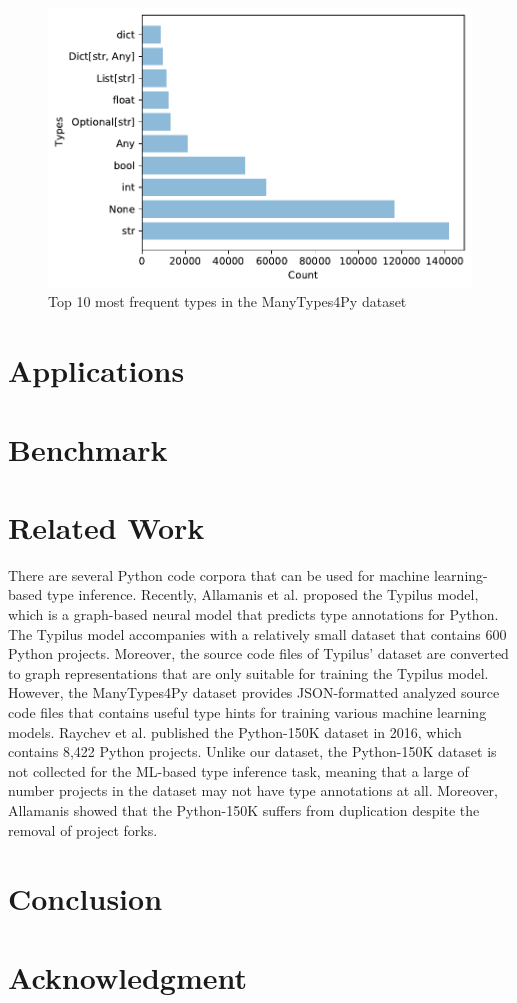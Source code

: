 \documentclass[10pt, conference]{IEEEtran}
\begin{document}
\begin{figure}
	\centering
	\includegraphics[width=\linewidth]{figs/top-10-most-frequent-types.pdf}
	\caption{Top 10 most frequent types in the ManyTypes4Py dataset}
	\label{fig:top-10-types}
\end{figure}

\section{Applications}


\section{Benchmark}

\section{Related Work}
There are several Python code corpora that can be used for machine learning-based type inference. Recently, Allamanis et al. \cite{allamanis2020typilus} proposed the Typilus model, which is a graph-based neural model that predicts type annotations for Python. The Typilus model \cite{allamanis2020typilus} accompanies with a relatively small dataset that contains 600 Python projects. Moreover, the source code files of Typilus' dataset are converted to graph representations that are only suitable for training the Typilus model. However, the ManyTypes4Py dataset provides JSON-formatted analyzed source code files that contains useful type hints for training various machine learning models. Raychev et al. \cite{raychev2016probabilistic} published the Python-150K dataset in 2016, which contains 8,422 Python projects. Unlike our dataset, the Python-150K dataset \cite{raychev2016probabilistic} is not collected for the ML-based type inference task, meaning that a large of number projects in the dataset may not have type annotations at all. Moreover, Allamanis \cite{allamanis2019adverse} showed that the Python-150K suffers from duplication despite the removal of project forks.


\section{Conclusion}

\section*{Acknowledgment}



\end{document}

